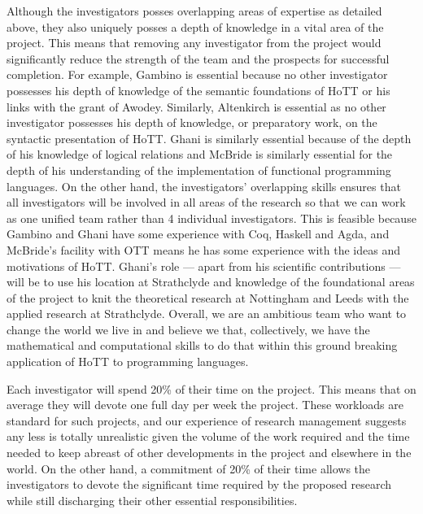 \documentclass[a4paper,11pt]{article}
\begin{document}
\noindent Although the investigators posses overlapping areas of expertise as
detailed above, they also uniquely posses a depth of knowledge
in a vital area of the project. This means that removing any
investigator from the project would significantly reduce the strength
of the team and the prospects for successful completion. For example,
Gambino is essential because no other investigator possesses his depth
of knowledge of the semantic foundations of HoTT or his links with the
grant of Awodey. Similarly, Altenkirch is essential as no other
investigator possesses his depth of knowledge, or preparatory work, on
the syntactic presentation of HoTT. Ghani is similarly essential because
of the depth of his knowledge of logical relations and McBride is
similarly essential for the depth of his understanding of the
implementation of functional programming languages. On the other hand,
the investigators' overlapping skills ensures that all investigators
will be involved in all areas of the research so that we can work
as one unified team rather than 4 individual investigators. This is
feasible because Gambino and Ghani have some experience with
Coq, Haskell and Agda, and McBride's facility with OTT means he has some experience with
the ideas and motivations of HoTT. Ghani's role --- apart from his
scientific contributions --- will be to use his location at
Strathclyde and knowledge of the foundational areas of the
project to knit the theoretical research at Nottingham and Leeds with
the applied research at Strathclyde. Overall, we are an ambitious
team who want to change the world we live in and believe we that,
collectively, we have the mathematical and computational skills to do
that within this ground breaking application of HoTT to programming languages.

\vspace{0.02in}

Each investigator will spend 20\% of their time on the project.  This
means that on average they will devote one full day per week the
project. These workloads are standard for such projects, and our
experience of research management suggests any less is totally
unrealistic given the volume of the work required and the time needed
to keep abreast of other developments in the project and elsewhere in
the world.  On the other hand, a commitment of 20\% of their time
allows the investigators to devote the significant time required by
the proposed research while still discharging their other essential
responsibilities.
\end{document}
